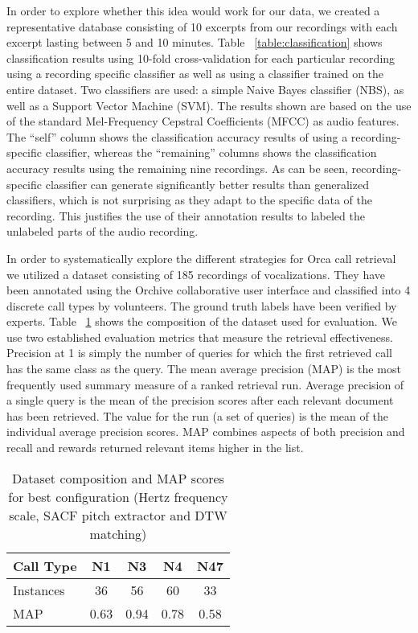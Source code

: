 In order to explore whether this idea would work for our data, we 
created a representative database consisting of 10 excerpts from 
our recordings with each excerpt lasting between 5 and 10 minutes. 
Table ~\ref{table:classification} shows classification results using 
10-fold cross-validation for each particular recording using a
recording specific classifier as well as using a classifier trained 
on the entire dataset. Two classifiers are used: a simple Naive Bayes
classifier (NBS), as well as a Support Vector Machine (SVM). The results shown 
are based on the use of the standard Mel-Frequency Cepstral
Coefficients (MFCC) as audio features. The ``self'' column shows the 
classification accuracy results of using a recording-specific
classifier, whereas the ``remaining'' columns 
shows the classification accuracy results using the remaining nine
recordings. As can be seen, recording-specific classifier can generate
significantly better results than generalized classifiers, which is not 
surprising as they adapt to the specific data of the recording. This
justifies the use of their annotation results to labeled the unlabeled 
parts of the audio recording. 


In order to systematically explore the different strategies for Orca
call retrieval we utilized a dataset consisting of 185 recordings of
vocalizations. They have been annotated using the Orchive
collaborative user interface and classified into 4 discrete call types
by volunteers. The ground truth labels have been verified by
experts. Table ~\ref{table:dataset} shows the composition of the
dataset used for evaluation. We use two established evaluation metrics
that measure the retrieval effectiveness. Precision at 1 is simply the
number of queries for which the first retrieved call has the same
class as the query. The mean average precision (MAP) is the most
frequently used summary measure of a ranked retrieval run. Average
precision of a single query is the mean of the precision scores after
each relevant document has been retrieved. The value for the run (a
set of queries) is the mean of the individual average precision
scores. MAP combines aspects of both precision and recall and rewards
returned relevant items higher in the list.


\begin{table} 
\begin{center}
\caption{Dataset composition and MAP scores for best configuration
  (Hertz frequency scale, SACF pitch extractor and DTW matching) } 
\begin{tabular}{|l|c|c|c|c|}
\hline
Call Type     & N1      & N3      & N4 & N47 \\ 
\hline 
Instances     & 36      & 56      & 60  &  33 \\ 
\hline 
MAP            & 0.63   &  0.94   & 0.78  & 0.58  \\ 
\hline 
\end{tabular} 
\label{table:dataset}
\end{center}
\end{table} 


